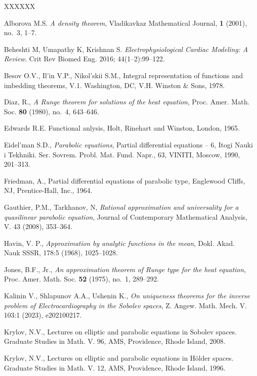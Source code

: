 \documentclass{amsart}
\theoremstyle{definition}
\theoremstyle{remark}
\numberwithin{equation}{section}
\begin{document}
\begin{thebibliography}{XXXXXX}

Alborova M.S. \textit{A density theorem}, Vladikavkaz Mathematical Journal, 
{\bf 1} (2001), no.~3, 1--7. 
 
{Beheshti M, Umapathy K, Krishnan S.}
\textit{Electrophysiological Cardiac Modeling: A Review}.
Crit Rev Biomed Eng. 2016; 44(1--2):99--122.

 Besov O.V., Il'in V.P., Nikol'skii S.M., Integral representation 
of functions and imbedding  theorems, V.1.
Washington, DC, V.H. Winston $\&$ Sons, 1978.

{ Diaz, R.},
  \textit{ A Runge theorem for solutions of the heat equation},
  Proc. Amer. Math. Soc. {\bf 80} (1980), no.~4, 643--646. 

 Edwards R.E. {Functional anlysis}, Holt, Rinehart and Winston, 
London, 1965.

 Eidel'man S.D., 
\textit{Parabolic equations}, 
Partial differential equations -- 6, Itogi Nauki i Tekhniki. Ser. Sovrem. Probl. Mat. Fund. 
Napr., 63, VINITI, Moscow, 1990, 201--313.

{Friedman, A.}, {Partial differential equations of parabolic type}, 
Englewood Cliffs, NJ, Prentice-Hall, Inc., 1964.

{Gauthier, P.M., Tarkhanov, N,} 
\textit{Rational approximation and universality for a quasilinear parabolic equation}, 
Journal of Contemporary Mathematical Analysis, V. 43 (2008), 353--364.

Havin, V. P., \textit{Approximation by analytic functions in the mean}, 
Dokl. Akad. Nauk SSSR, 178:5 (1968),  1025--1028. 

{Jones, B.F., Jr.},
  \textit{ An approximation theorem of Runge type for the heat equation},
  Proc. Amer. Math. Soc. {\bf 52} (1975), no.~1, 289--292.

Kalinin V.,  Shlapunov A.A.,  Ushenin K.,
\textit{On uniqueness theorems for the inverse problem of Electrocardiography in the Sobolev 
spaces}, Z. Angew. Math. Mech. V. 103:1 (2023), e202100217.

 {Krylov, N.V.},
{Lectures on elliptic and parabolic equations in Sobolev spaces}. Graduate Studies in 
Math. V. 96,  AMS, Providence, Rhode Island, 2008.
	
 {Krylov, N.V.},
{Lectures on elliptic and parabolic equations in H\"older spaces}. Graduate Studies in 
Math. V. 12,  AMS, Providence, Rhode Island, 1996.


\end{thebibliography}
\end{document}
